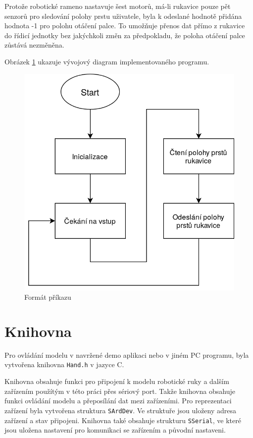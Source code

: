 \documentclass[thesis=B,czech]{FITthesis}[2012/06/26]
\begin{document}
Protože robotické rameno nastavuje šest motorů, má-li rukavice pouze pět senzorů pro sledování polohy prstu uživatele, byla k odeslané hodnotě přidána hodnota -1 pro polohu otáčení palce. To umožňuje přenos dat přímo z rukavice do řídicí jednotky bez jakýchkoli změn za předpokladu, že poloha otáčení palce zůstává nezměněna. 

Obrázek \ref{fig:GloveProgDiagr} ukazuje vývojový diagram implementovaného programu.

\newpage

 \begin{figure}[H]
\centering
\includegraphics[scale=0.35]{./image/GloveProgDiagr.png}
\caption{Formát příkazu}
\label{fig:GloveProgDiagr}
\end{figure} 



\section{Knihovna}

Pro ovládání modelu v navržené demo aplikaci nebo v jiném PC programu, byla vytvořena knihovna \texttt{Hand.h} v jazyce C. 

Knihovna obsahuje funkci pro připojení k modelu robotické ruky a dalším zařízením použítým v této práci přes sériový port. Takže knihovna obsahuje funkci ovládání modelu a přeposílání dat mezi zařízeními. Pro reprezentaci zařízení byla vytvořena struktura \texttt{SArdDev}. Ve struktuře jsou uloženy adresa zařízení a stav připojeni. Knihovna také obsahuje strukturu \texttt{SSerial}, ve které jsou uložena nastavení pro komunikaci se zařízením a původní nastaveni.
\end{document}
